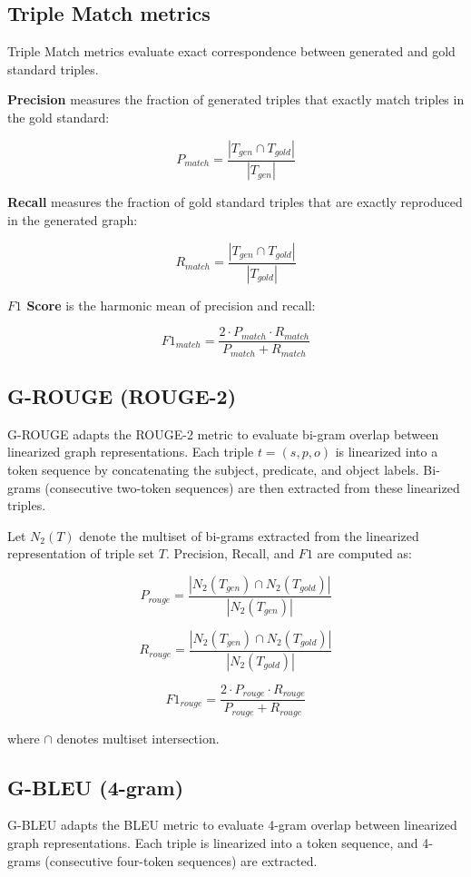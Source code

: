 \documentclass[preprint,12pt]{elsarticle}
\begin{document}
\subsection{Triple Match metrics}\label{app2_1}
Triple Match metrics evaluate exact correspondence between generated and gold standard triples.

\textbf{Precision} measures the fraction of generated triples that exactly match triples in the gold standard:

$$
P_{match} = \frac{|T_{gen} \cap T_{gold}|}{|T_{gen}|}
$$

\textbf{Recall} measures the fraction of gold standard triples that are exactly reproduced in the generated graph:

$$
R_{match} = \frac{|T_{gen} \cap T_{gold}|}{|T_{gold}|}
$$

\textbf{$F1$ Score} is the harmonic mean of precision and recall:

$$
F1_{match} = \frac{2 \cdot P_{match} \cdot R_{match}}{P_{match} + R_{match}}
$$

\subsection{G-ROUGE (ROUGE-2)}\label{app2_2}
G-ROUGE adapts the ROUGE-2 metric to evaluate bi-gram overlap between linearized graph representations. Each triple $t = (s, p, o)$ is linearized into a token sequence by concatenating the subject, predicate, and object labels. Bi-grams (consecutive two-token sequences) are then extracted from these linearized triples.

Let $N_2(T)$ denote the multiset of bi-grams extracted from the linearized representation of triple set $T$. Precision, Recall, and $F1$ are computed as:

$$
P_{rouge} = \frac{|N_2(T_{gen}) \cap N_2(T_{gold})|}{|N_2(T_{gen})|}
$$

$$
R_{rouge} = \frac{|N_2(T_{gen}) \cap N_2(T_{gold})|}{|N_2(T_{gold})|}
$$

$$
F1_{rouge} = \frac{2 \cdot P_{rouge} \cdot R_{rouge}}{P_{rouge} + R_{rouge}}
$$

where $\cap$ denotes multiset intersection.

\subsection{G-BLEU (4-gram)}\label{app2_3}
G-BLEU adapts the BLEU metric to evaluate 4-gram overlap between linearized graph representations. Each triple is linearized into a token sequence, and 4-grams (consecutive four-token sequences) are extracted.
\end{document}

